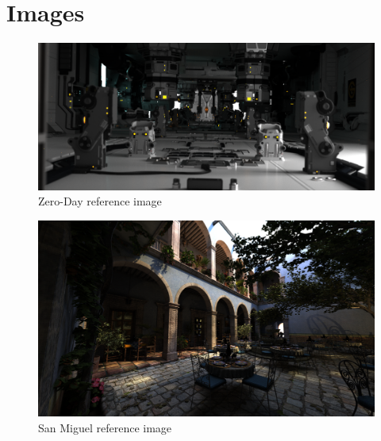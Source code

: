 \chapter{Images}

\begin{figure}
    \centering
    \includegraphics[width=1\textwidth]{figures/References/frame25_spat_REF_ps12288_t43568_47001.png}
    \caption{Zero-Day reference image}
    \label{fig:zdref}
\end{figure}

\begin{figure}
    \centering
    \includegraphics[width=1\textwidth]{figures/References/sanmiguel_cam25_REF_spat_ps8192_t59288_71697.png}
    \caption{San Miguel reference image}
    \label{fig:smigref}
\end{figure}